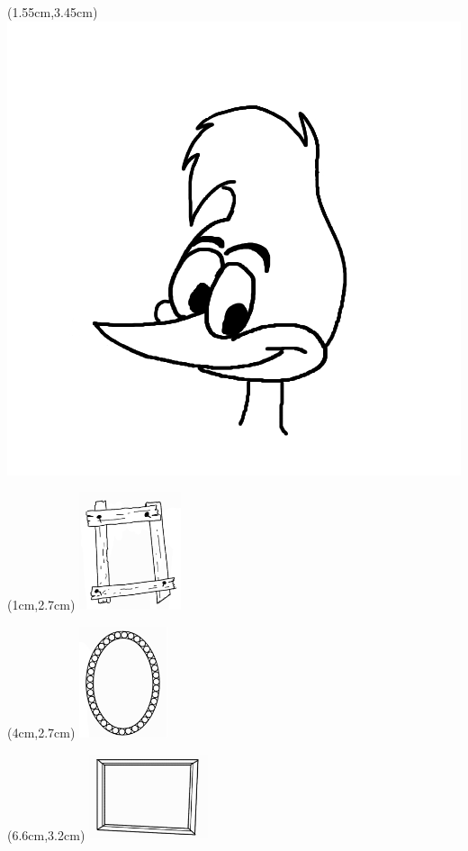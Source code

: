 \begin{textblock*}{6cm}(1.55cm,3.45cm) %
  \includegraphics[width=2 cm]{./bilder/ramar/hacke_portratt_2.png} %
\end{textblock*}



\begin{textblock*}{6cm}(1cm,2.7cm) %
  \includegraphics[width=3cm]{./bilder/ramar/Ram4.png} %
\end{textblock*}

\begin{textblock*}{6cm}(4cm,2.7cm) %
  \includegraphics[width=2.6cm]{./bilder/ramar/Ram5.png} %
\end{textblock*}

\begin{textblock*}{6cm}(6.6cm,3.2cm) %
  \includegraphics[width=3.5cm]{./bilder/ramar/Ram6.png} %
\end{textblock*}



